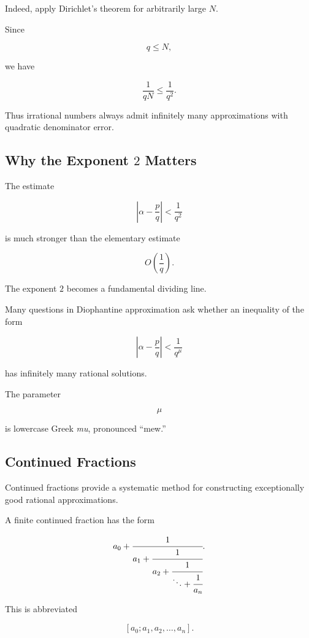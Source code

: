 Indeed, apply Dirichlet's theorem for arbitrarily large \(N\).

Since

\[ q\leq N, \]

we have

\[ \frac1{qN}\leq\frac1{q^2}. \]

Thus irrational numbers always admit infinitely many approximations with
quadratic denominator error.

\subsection{Why the Exponent \(2\) Matters}
\label{subsec:approximation-exponent-two}

The estimate

\[ \left|\alpha-\frac pq\right|<\frac1{q^2} \]

is much stronger than the elementary estimate

\[ O\left(\frac1q\right). \]

The exponent \(2\) becomes a fundamental dividing line.

Many questions in Diophantine approximation ask whether an inequality of the
form

\[ \left|\alpha-\frac pq\right|<\frac1{q^\mu} \]

has infinitely many rational solutions.

The parameter

\[ \mu \]

is lowercase Greek \emph{mu}, pronounced ``mew.''

\subsection{Continued Fractions}
\label{subsec:continued-fractions}

Continued fractions provide a systematic method for constructing exceptionally
good rational approximations.

A finite continued fraction has the form

\[
a_0+\cfrac{1}{
a_1+\cfrac{1}{
a_2+\cfrac{1}{
\ddots+\cfrac1{a_n}}}}.
\]

This is abbreviated

\[ [a_0;a_1,a_2,\ldots,a_n]. \]

